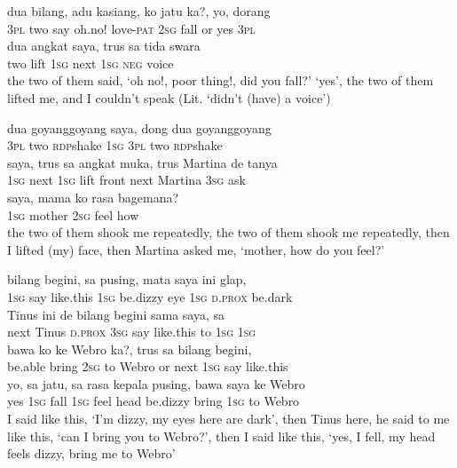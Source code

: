 \ea
{}   dua    {bilang,}    {adu}    {kasiang,}   ko   jatu   ka?,   yo,   dorang\\
   {\textsc{3pl}}   two    {say}    {oh.no!}    {love-\textsc{pat}}   \textsc{2sg}   fall   or   yes   \textsc{3pl}\\
\gll dua    {angkat}   saya,    {trus}    {sa}   tida    {swara}\\
  two    {lift}   \textsc{1sg}    {next}    {\textsc{1sg}}   \textsc{neg}    {voice}\\
\glt
the two of them said, ‘oh no!, poor thing!, did you fall?’ ‘yes’, the two of them lifted me, and I couldn’t speak (Lit. ‘didn’t (have) a voice’)
\z

\ea
{}   dua    {goyang{\Tilde}goyang}    {saya,}    {dong}   dua    {goyang{\Tilde}goyang}\\
   {\textsc{3pl}}   two    {\textsc{rdp}{\Tilde}shake}    {\textsc{1sg}}    {\textsc{3pl}}   two    {\textsc{rdp}{\Tilde}shake}\\
\gll saya,    {trus}    {sa}    {angkat}    {muka,}    {trus}    {Martina}   de   tanya\\
  \textsc{1sg}    {next}    {\textsc{1sg}}    {lift}    {front}    {next}    {Martina}   \textsc{3sg}   ask\\
\gll saya,    {mama}    {ko}   rasa    {bagemana?}\\
  \textsc{1sg}    {mother}    {\textsc{2sg}}   feel    {how}\\
\glt
the two of them shook me repeatedly, the two of them shook me repeatedly, then I lifted (my) face, then Martina asked me, ‘mother, how do you feel?’
\z

\ea
{}    {bilang}    {begini,}    {sa}    {pusing,}    {mata}    {saya}    {ini}    {glap,}\\
   {\textsc{1sg}}    {say}    {like.this}    {\textsc{1sg}}    {be.dizzy}    {eye}    {\textsc{1sg}}    {\textsc{d.prox}}    {be.dark}\\
    {Tinus}    {ini}    {de}    {bilang}    {begini}    {sama}    {saya,}    {sa}\\
   {next}    {Tinus}    {\textsc{d.prox}}    {\textsc{3sg}}    {say}    {like.this}    {to}    {\textsc{1sg}}    {\textsc{1sg}}\\
    {bawa}    {ko}    {ke}    {Webro}    {ka?,}   trus    {sa}    {bilang}    {begini,}\\
   {be.able}    {bring}    {\textsc{2sg}}    {to}    {Webro}    {or}   next    {\textsc{1sg}}    {say}    {like.this}\\
\gll yo,    {sa}    {jatu,}    {sa}    {rasa}    {kepala}    {pusing,}    {bawa}    {saya}    {ke}   Webro\\
  yes    {\textsc{1sg}}    {fall}    {\textsc{1sg}}    {feel}    {head}    {be.dizzy}    {bring}    {\textsc{1sg}}    {to}   Webro\\
\glt
I said like this, ‘I’m dizzy, my eyes here are dark’, then Tinus here, he said to me like this, ‘can I bring you to Webro?’, then I said like this, ‘yes, I fell, my head feels dizzy, bring me to Webro’
\z

